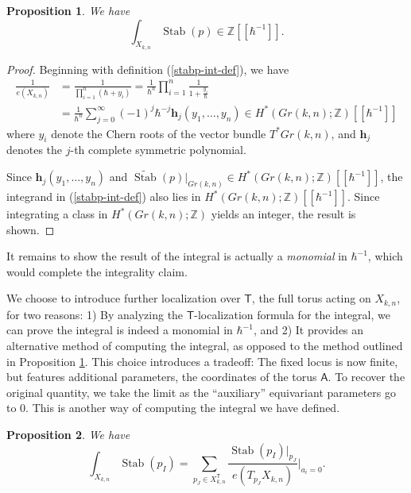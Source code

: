 \documentclass[12 pt]{article}
\theoremstyle{plain}
\theoremstyle{plain}
\theoremstyle{plain}
\theoremstyle{plain}
\theoremstyle{plain}
\theoremstyle{plain}
\theoremstyle{plain}
\newtheorem{proposition}{Proposition}[section]
\theoremstyle{plain}
\theoremstyle{plain}
\theoremstyle{plain}
\theoremstyle{remark}
\theoremstyle{remark}
\theoremstyle{definition}
\theoremstyle{definition}
\theoremstyle{definition}
\theoremstyle{definition}
\theoremstyle{definition}
\theoremstyle{definition}
\DeclareMathOperator{\Stab}{Stab}
\newcommand{\bT}{\mathsf{T}}
\newcommand{\bA}{\mathsf{A}}
\begin{document}
\begin{proposition}\label{int-is-integer}
We have
\[
\int_{X_{k,n}}\Stab(p)\in\mathbb{Z}[[\hbar^{-1}]].
\] 
\end{proposition}

\begin{proof}
Beginning with definition (\ref{stabp-int-def}), we have
\begin{align*}
\frac1{e(X_{k,n})}&=\frac1{\prod\limits_{i=1}^{n}(\hbar+y_{i})}=\frac{1}{\hbar^{n}}\prod\limits_{i=1}^{n}\frac{1}{1+\frac{y_i}{\hbar}}\\
&=\frac{1}{\hbar^{n}}\sum\limits_{j=0}^{\infty}(-1)^{j}\hbar^{-j}\mathbf{h}_{j}(y_{1},\dots,y_{n})\in H^{*}(Gr(k,n);\mathbb{Z})[[\hbar^{-1}]]
\end{align*} 
where $y_{i}$ denote the Chern roots of the vector bundle $T^*Gr(k,n)$, and $\mathbf{h}_{j}$ denotes the $j$-th complete symmetric polynomial.

Since $\mathbf{h}_{j}(y_{1},\dots,y_{n})$ and $ \widetilde{\Stab}(p)|_{Gr(k,n)}\in H^{*}(Gr(k,n);\mathbb{Z})[[\hbar^{-1}]]$, the integrand in (\ref{stabp-int-def}) also lies in $H^{*}(Gr(k,n);\mathbb{Z})[[\hbar^{-1}]]$. Since integrating a class in $H^{*}(Gr(k,n);\mathbb{Z})$ yields an integer, the result is shown.
\end{proof}

It remains to show the result of the integral is actually a \textit{monomial} in $\hbar^{-1}$, which would complete the integrality claim.  

We choose to introduce further localization over $\bT$, the full torus acting on $X_{k,n}$, for two reasons: 1) By analyzing the $\bT$-localization formula for the integral, we can prove the integral is indeed a monomial in $\hbar^{-1}$, and 2) It provides an alternative method of computing the integral, as opposed to the method outlined in Proposition \ref{int-is-integer}. This choice introduces a tradeoff: The fixed locus is now finite, but features additional parameters, the coordinates of the torus $\bA$. To recover the original quantity, we take the limit as the ``auxiliary'' equivariant parameters go to 0. This is another way of computing the integral we have defined.

\begin{proposition}\label{comm-diagram}
We have
\begin{equation}\label{comm-diagram-eqn}
\int_{X_{k,n}}\Stab(p_I) = \sum_{p_J\in X_{k,n}^\bT}\frac{\Stab(p_I)|_{p_J}}{e(T_{p_J}X_{k,n})}\Bigg|_{a_i=0}.
\end{equation}

\end{proposition}
\end{document}
